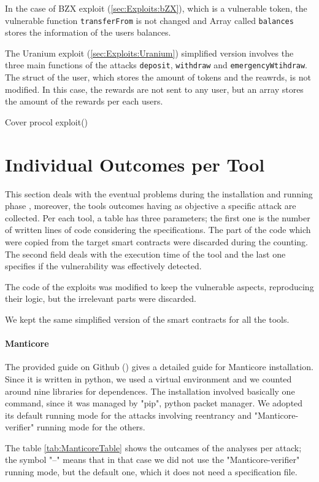In the case of BZX exploit (\autoref{sec:Exploits:bZX}), which is a vulnerable token,  
the vulnerable function \texttt{transferFrom} is not changed and Array called \texttt{balances} stores the information of the users balances.

The Uranium exploit (\autoref{sec:Exploits:Uranium}) simplified version involves the three main functions of the attacks 
\texttt{deposit}, \texttt{withdraw} and \texttt{emergencyWtihdraw}. 
The struct of the user, which stores the amount of tokens and the reawrds, is not modified.
In this case, the rewards are not sent to any user, but an array stores the amount of the rewards per each users. 

Cover procol exploit(\autore)

\section{Individual Outcomes per Tool}

This section deals with the eventual problems during the installation and running phase , 
moreover, the tools outcomes having as objective a specific attack are collected. 
Per each tool, a table has three parameters; the first one is the number of written lines of code considering the specifications. 
The part of the code which were copied from the target smart contracts were discarded during the counting. 
The second field deals with the execution time of the tool and the last one specifies if the vulnerability was effectively detected.

The code of the exploits was modified to keep the vulnerable aspects, reproducing their logic, but the irrelevant parts were discarded.

We kept the same simplified version of the smart contracts for all the tools.

\paragraph{Manticore} The provided guide on Github (\cite{ManticoreGitHub}) gives a detailed guide for Manticore installation. 
Since it is written in python, we used a virtual environment and we counted around nine libraries for dependences. 
The installation involved basically one command, since it was managed by "pip", python packet manager.
We adopted its default running mode for the attacks involving reentrancy and "Manticore-verifier" running mode for the others. 

The table \autoref*{tab:ManticoreTable} shows the outcames of the analyses per attack; the symbol "--" means that in that case we did not use the 
"Manticore-verifier" running mode, but the default one, which it does not need a specification file.

